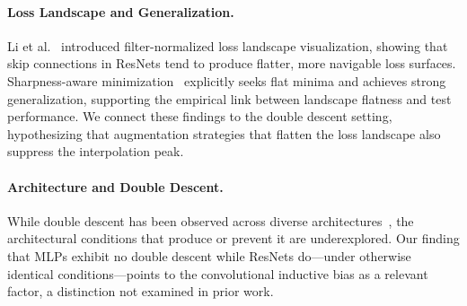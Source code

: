 \paragraph{Loss Landscape and Generalization.}
Li et al.~\cite{li2018visualizing} introduced filter-normalized loss landscape visualization, showing that skip connections in ResNets tend to produce flatter, more navigable loss surfaces. Sharpness-aware minimization~\cite{foret2021sharpness} explicitly seeks flat minima and achieves strong generalization, supporting the empirical link between landscape flatness and test performance. We connect these findings to the double descent setting, hypothesizing that augmentation strategies that flatten the loss landscape also suppress the interpolation peak.

\paragraph{Architecture and Double Descent.}
While double descent has been observed across diverse architectures~\cite{nakkiran2020deep}, the architectural conditions that produce or prevent it are underexplored. Our finding that MLPs exhibit no double descent while ResNets do---under otherwise identical conditions---points to the convolutional inductive bias as a relevant factor, a distinction not examined in prior work.
